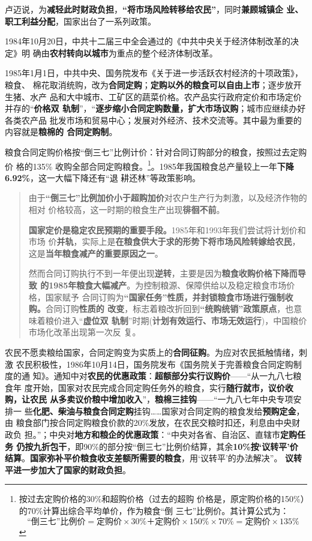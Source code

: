 卢迈说，为\textbf{减轻此时财政负担}，\textbf{“将市场风险转移给农民”}，同时\textbf{兼顾城镇企
  业、职工利益分配}，国家出台了一系列政策。

1984年10月20日，中共十二届三中全会通过的《中共中央关于经济体制改革的决定》明
确由\textbf{农村转向以城市}为重点的整个经济体制改革。

1985年1月1日，中共中央、国务院发布《关于进一步活跃农村经济的十项政策》，粮食、
棉花取消统购，改为\textbf{合同定购}；\textbf{定购以外的粮食可以自由上市}；逐步放开生猪、水产
品和大中城市、工矿区的蔬菜价格。农产品实行政府定价和市场定价并存的“\textbf{价格双
  轨制}”，“\textbf{逐步缩小合同定购数量，扩大市场议购}；城市应继续办好各类农产品
批发市场和贸易中心；发展对外经济、技术交流等。其中最为重要的内容就是\textbf{粮棉的
  合同定购制}。

粮食合同定购价格按“倒三七”比例计价：针对合同订购部分的粮食，按照过去定购价
格的135\% 收购全部合同定购粮食。\footnote{按过去定购价格的30\%和超购价格（过去的超购
  价格是，原定购价格的150\%）的70\%计算出综合平均单价，作为粮食“倒
  三七”比例价。其计算公式为：
  \[ “倒三七”比例价 = 定购价 \times 30\% ＋ 定购价 \times 150\% \times 70\% =定购价 \times
    135\%\]}。1985年我国粮食总产量较上一年\textbf{下降6.92\%}，这一大幅下降还有“退
耕还林”等政策影响。

\begin{quotation}
  由于\textbf{“倒三七”比例加价小于超购加价}对农户生产行为刺激，以及经济作物的相对
  价格较高，这一时期的粮食生产出现\textbf{徘徊不前}。\cite{shuangguizhi}

  \textbf{国家定价是稳定农民预期的重要手段。}1985年和1993年我们尝试将计划价和市场
  价\textbf{并轨}，实际上是\textbf{在粮食供大于求的形势下将市场风险转嫁给农民}，
  这是\textbf{当年粮食减产的重要原因之一}。\cite{lumaisg}

  然而合同订购执行不到一年便出现\textbf{逆转}，主要是因为\textbf{粮食收购价格下降而导致
    的1985年粮食大幅减产}。为控制粮源、保障供给以及稳定粮食市场价格，国家赋予
  合同订购为\textbf{“国家任务”性质，并封锁粮食市场进行强制收购。}合同订购\textbf{性质的
    改变}，标志着粮改折回到\textbf{“统购统销”政策原点}，也意味着粮价进入“\textbf{虚位双
    轨制}”时期(\textbf{计划有效运行、市场无效运行})，中国粮价市场化改革出现第一次反
  复。\cite{liangshi40}
\end{quotation}

农民不愿卖粮给国家，合同定购变为实质上的\textbf{合同征购}。为应对农民抵触情绪，刺激
农民积极性，1986年10月14日，国务院发布《国务院关于完善粮食合同定购制度的通
知》。通知中对\textbf{农民的优惠政策}：\textbf{超额部分实行议购价}——“从一九八七粮食年
度开始，国家对农民完成合同定购任务外的粮食，实行\textbf{随行就市，议价收购，让农民
  从多卖议价粮中增加收入}”，\textbf{粮棉三挂钩}——“一九八七年中央专项安排一
些\textbf{化肥、柴油与粮食合同定购}挂钩……国家对合同定购的粮食发给\textbf{预购定金}，由
粮食部门按合同定购粮食价款的20\%发放，在农民交粮时扣还，利息由中央财政负
担。”；中央对\textbf{地方和粮企的优惠政策}：“中央对各省、自治区、直辖市\textbf{定购任务
  仍按九折包干}，即90\%的部分按“倒三七”比例价结算，其余\textbf{10\%按‘议转平’价
  结算}。\textbf{国家弥补平价粮食收支差额所需要的粮食}，用‘议转平’的办法解决”。
\textbf{议转平进一步加大了国家的财政负担}。



